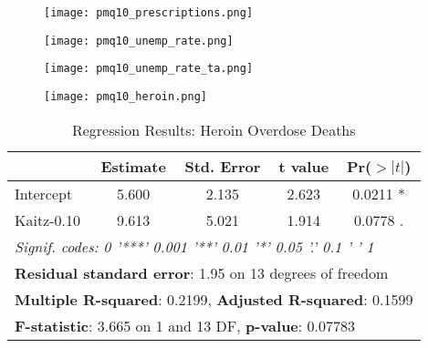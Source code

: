 \documentclass[12pt,a4paper]{article}
\begin{document}
\newpage

\begin{figure}[htbp]
    \centering
    \texttt{[image: pmq10\_prescriptions.png]}
    \caption{}
    \label{fig:prescriptions}
\end{figure}

\newpage

\begin{figure}[htbp]
    \centering
    \texttt{[image: pmq10\_unemp\_rate.png]}
    \caption{}
    \label{fig:unemp_rate}
\end{figure}

\newpage

\begin{figure}[htbp]
    \centering
    \texttt{[image: pmq10\_unemp\_rate\_ta.png]}
    \caption{}
    \label{fig:unemp_rate_ta}
\end{figure}

\newpage

\begin{figure}[htbp]
    \centering
    \texttt{[image: pmq10\_heroin.png]}
    \caption{}
    \label{fig:drugs}
\end{figure}

\newpage

\begin{table}[ht]
    \centering
    \begin{tabular}{lcccc}
    \toprule
     & \textbf{Estimate} & \textbf{Std. Error} & \textbf{t value} & \textbf{Pr($>|t|$)} \\
    \midrule
    Intercept  & 5.600 & 2.135 & 2.623 & 0.0211 * \\
    Kaitz-0.10 & 9.613 & 5.021 & 1.914 & 0.0778 . \\
    \midrule
    \multicolumn{5}{l}{\textit{Signif. codes:  0 '***' 0.001 '**' 0.01 '*' 0.05 '.' 0.1 ' ' 1}} \\
    \midrule
    \multicolumn{5}{l}{\textbf{Residual standard error}: 1.95 on 13 degrees of freedom} \\
    \multicolumn{5}{l}{\textbf{Multiple R-squared}: 0.2199, \textbf{Adjusted R-squared}: 0.1599} \\
    \multicolumn{5}{l}{\textbf{F-statistic}: 3.665 on 1 and 13 DF, \textbf{p-value}: 0.07783} \\
    \bottomrule
    \end{tabular}
    \caption{Regression Results: Heroin Overdose Deaths}
    \label{tab:regression_results_heroin}
\end{table}
\end{document}
